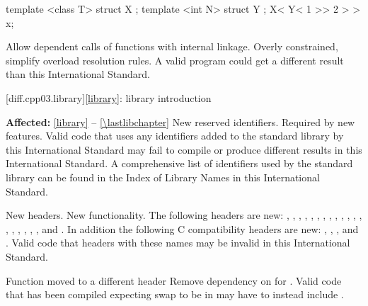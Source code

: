 \begin{codeblock}
template <class T> struct X { };
template <int N> struct Y { };
X< Y< 1 >> 2 > > x;
\end{codeblock}

\change
Allow dependent calls of functions with internal linkage.
\rationale
Overly constrained, simplify overload resolution rules.
\effect
A valid \CppIII{} program could get a different result than this
International Standard.

[diff.cpp03.library]{\ref{library}: library introduction}

\pnum
\textbf{Affected:} \ref{library} -- \ref{\lastlibchapter}
\change
New reserved identifiers.
\rationale
Required by new features.
\effect
Valid \CppIII{} code that uses any identifiers added to the \Cpp{} standard
library by this International Standard may fail to compile or produce different
results in this International Standard. A comprehensive list of identifiers used
by the \Cpp{} standard library can be found in the Index of Library Names in this
International Standard.

\change
New headers.
\rationale
New functionality.
\effect
The following \Cpp{} headers are new:
,
,
,
,
,
,
,
,
,
,
,
,
,
,
,
,
,
,
,
and
.
In addition the following C compatibility headers are new:
,
,
,
and
.
Valid \CppIII{} code that  headers with these names may be
invalid in this International Standard.

\effect
Function  moved to a different header
\rationale
Remove dependency on  for .
\effect
Valid \CppIII{} code that has been compiled expecting swap to be in
 may have to instead include .

